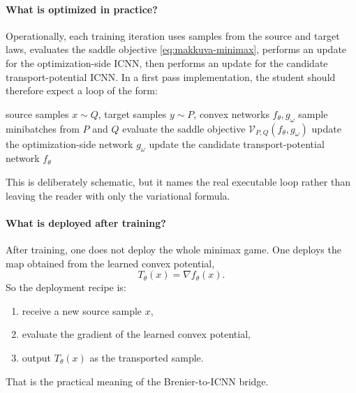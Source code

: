 \documentclass[11pt]{report}
\begin{document}
\paragraph{What is optimized in practice?}
Operationally, each training iteration uses samples from the source and target
laws, evaluates the saddle objective \eqref{eq:makkuva-minimax}, performs an
update for the optimization-side ICNN, then performs an update for the candidate
transport-potential ICNN.  In a first pass implementation, the student should
therefore expect a loop of the form:
\begin{algorithm}[ht]
\caption{Makkuva-style OT-ICNN training loop}
\begin{algorithmic}[1]
\Require source samples $x\sim Q$, target samples $y\sim P$, convex networks $f_\theta,g_\omega$
  \State sample minibatches from $P$ and $Q$
  \State evaluate the saddle objective $\mathcal V_{P,Q}(f_\theta,g_\omega)$
  \State update the optimization-side network $g_\omega$
  \State update the candidate transport-potential network $f_\theta$
\EndFor
\end{algorithmic}
\end{algorithm}
This is deliberately schematic, but it names the real executable loop rather than
leaving the reader with only the variational formula.

\paragraph{What is deployed after training?}
After training, one does not deploy the whole minimax game.  One deploys the map
obtained from the learned convex potential,
\begin{equation}
T_\theta(x)=\nabla f_\theta(x).
\label{eq:makkuva-deployment-map-again}
\end{equation}
So the deployment recipe is:
\begin{enumerate}[label=(\arabic*)]
  \item receive a new source sample $x$,
  \item evaluate the gradient of the learned convex potential,
  \item output $T_\theta(x)$ as the transported sample.
\end{enumerate}
That is the practical meaning of the Brenier-to-ICNN bridge.
\end{document}
